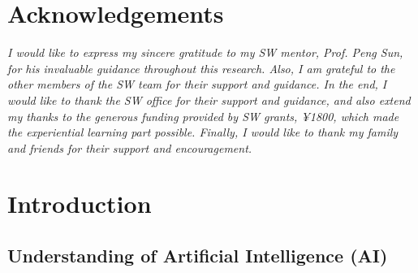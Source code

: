 \documentclass[11pt,a4paper,oneside]{report}
\newcommand{\instructions}[1]{{\color{black}\itshape #1}}
\begin{document}

\chapter*{Acknowledgements}
\label{acknowledgements}

\instructions{I would like to express my sincere gratitude to my SW mentor, Prof. Peng Sun, 
for his invaluable guidance throughout this research. 
Also, I am grateful to the other members of the SW team for their support and guidance. 
In the end, I would like to thank the SW office for their support and guidance, 
and also extend my thanks to the generous funding provided by SW grants, ¥1800, which made the experiential learning part possible. 
Finally, I would like to thank my family and friends for their support and encouragement. 
}

\newpage


\setcounter{tocdepth}{1}
\listoffigures\newpage


\setcounter{tocdepth}{1}
\listoftables\newpage



\clearpage
{}


\chapter{Introduction}
\label{introduction}

\section{Understanding of Artificial Intelligence (AI)}
\end{document}
